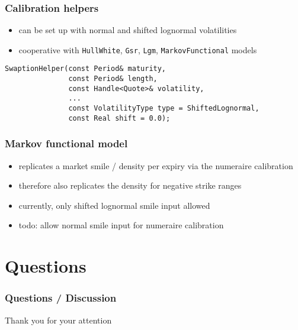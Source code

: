 \documentclass{beamer}
\begin{document}
\begin{frame}[fragile]
\frametitle{Calibration helpers}
\begin{itemize}
\item can be set up with normal and shifted lognormal volatilities
\item cooperative with \verb+HullWhite+, \verb+Gsr+, \verb+Lgm+, \verb+MarkovFunctional+ models
\end{itemize}
\begin{verbatim}
SwaptionHelper(const Period& maturity,
               const Period& length,
               const Handle<Quote>& volatility,
               ...
               const VolatilityType type = ShiftedLognormal,
               const Real shift = 0.0);
\end{verbatim}
\end{frame}

\begin{frame}[fragile]
\frametitle{Markov functional model}
\begin{itemize}
\item replicates a market smile / density per expiry via the numeraire calibration
\item therefore also replicates the density for negative strike ranges
\item currently, only shifted lognormal smile input allowed
\item todo: allow normal smile input for numeraire calibration
\end{itemize}
\end{frame}

\section{Questions}

\begin{frame}[fragile]
\frametitle{Questions / Discussion}
\centerline{Thank you for your attention}
\end{frame}
\end{document}
